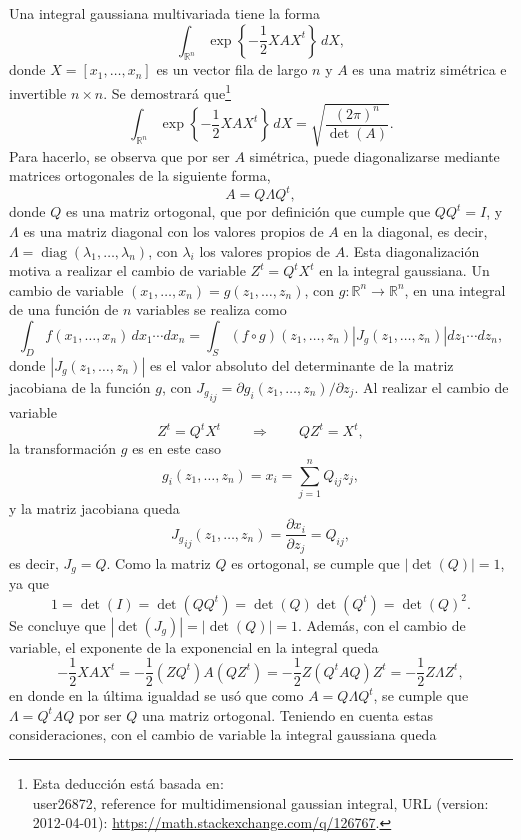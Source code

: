 \documentclass[a4paper]{report}
\begin{document}
Una integral gaussiana multivariada tiene la forma
\[
 \int_{{\mathbb{R}^n}}\exp\left\{-\frac{1}{2}XAX^t\right\}\,dX,
\]
donde \(X=[x_1,\dots,x_n]\) es un vector fila de largo \(n\) y \(A\) es una matriz simétrica e invertible \(n\times n\). Se demostrará que\footnote{Esta deducción está basada en:\\user26872, reference for multidimensional gaussian integral, URL (version: 2012-04-01): \url{https://math.stackexchange.com/q/126767}.}
\begin{equation}\label{eq:multivariate_gaussian_integral}
 \int_{{\mathbb{R}^n}}\exp\left\{-\frac{1}{2}XAX^t\right\}\,dX=\sqrt{\frac{(2\pi)^n}{\det(A)}}.
\end{equation}
Para hacerlo, se observa que por ser \(A\) simétrica, puede diagonalizarse mediante matrices ortogonales de la siguiente forma,
\[
 A=Q\Lambda Q^t,
\]
donde \(Q\) es una matriz ortogonal, que por definición que cumple que \(QQ^t=I\), y \(\Lambda\) es una matriz diagonal con los valores propios de \(A\) en la diagonal, es decir, \(\Lambda=\operatorname{diag}(\lambda_1,\dots,\lambda_n)\), con \(\lambda_i\) los valores propios de \(A\). Esta diagonalización motiva a realizar el cambio de variable \(Z^t=Q^tX^t\) en la integral gaussiana. Un cambio de variable \((x_1,\dots,x_n)=g(z_1,\dots,z_n)\), con \(g:\mathbb{R}^n\to\mathbb{R}^n\), en una integral de una función de \(n\) variables se realiza como
\[
 \int_D f(x_1,\dots,x_n)\,dx_1\cdots dx_n=\int_S(f\circ g)(z_1,\dots,z_n)|J_g(z_1,\dots,z_n)|dz_1\cdots dz_n,
\]
donde \(|J_g(z_1,\dots,z_n)|\) es el valor absoluto del determinante de la matriz jacobiana de la función \(g\), con \({J_g}_{ij}=\partial g_i(z_1,\dots,z_n)/\partial z_j\). Al realizar el cambio de variable
\[
 Z^t=Q^tX^t\qquad\Rightarrow\qquad QZ^t=X^t,
\]
la transformación \(g\) es en este caso
\[
 g_i(z_1,\dots,z_n)=x_i=\sum_{j=1}^nQ_{ij}z_j,
\]
y la matriz jacobiana queda
\[
 {J_g}_{ij}(z_1,\dots,z_n)=\frac{\partial x_i}{\partial z_j}=Q_{ij},
\]
es decir, \(J_g=Q\). Como la matriz \(Q\) es ortogonal, se cumple que \(|\det(Q)|=1\), ya que
\[
 1=\det(I)=\det(QQ^t)=\det(Q)\det(Q^t)=\det(Q)^2.
\]
Se concluye que \(|\det(J_g)|=|\det(Q)|=1\). Además, con el cambio de variable, el exponente de la exponencial en la integral queda
\[
 -\frac{1}{2}XAX^t=-\frac{1}{2}(ZQ^t)A(QZ^t)=-\frac{1}{2}Z(Q^tAQ)Z^t=-\frac{1}{2}Z\Lambda Z^t,
\]
en donde en la última igualdad se usó que como \(A=Q\Lambda Q^t\), se cumple que \(\Lambda = Q^tAQ\) por ser \(Q\) una matriz ortogonal. Teniendo en cuenta estas consideraciones, con el cambio de variable la integral gaussiana queda
\end{document}
